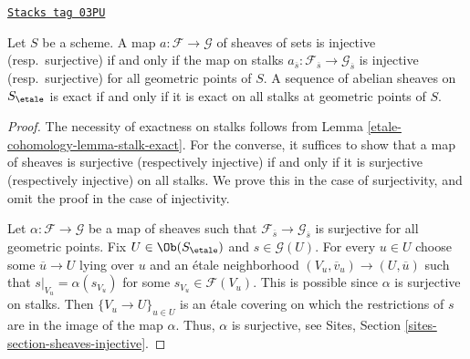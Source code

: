 \begin{theorem}
\label{etale-cohomology-theorem-exactness-stalks}
\href{https://stacks.math.columbia.edu/tag/03PU}{\texttt{Stacks tag 03PU}}

Let $S$ be a scheme.
A map $a : \mathcal{F} \to \mathcal{G}$ of sheaves of sets is injective
(resp.\ surjective) if and only if the map on stalks
$a_{\overline{s}} : \mathcal{F}_{\overline{s}} \to \mathcal{G}_{\overline{s}}$
is injective (resp.\ surjective) for all geometric points of $S$.
A sequence of abelian sheaves on $S_\etale$ is exact
if and only if it is exact on all stalks at geometric points of $S$.
\end{theorem}

\begin{proof}
The necessity of exactness on stalks follows from
Lemma \ref{etale-cohomology-lemma-stalk-exact}.
For the converse, it suffices to show that a map of sheaves is surjective
(respectively injective) if and only if it is surjective (respectively
injective) on all stalks. We prove this in the case of surjectivity, and omit
the proof in the case of injectivity.

\medskip\noindent
Let $\alpha : \mathcal{F} \to \mathcal{G}$ be a map of sheaves such
that $\mathcal{F}_{\overline{s}} \to \mathcal{G}_{\overline{s}}$
is surjective for all geometric points. Fix
$U \in \Ob(S_\etale)$
and $s \in \mathcal{G}(U)$. For every $u \in U$ choose some
$\overline{u} \to U$ lying over $u$ and an \'etale neighborhood
$(V_u , \overline{v}_u) \to (U, \overline{u})$ such that
$s|_{V_u} = \alpha(s_{V_u})$ for some
$s_{V_u} \in \mathcal{F}(V_u)$.
This is possible since $\alpha$ is surjective on
stalks. Then $\{V_u \to U\}_{u \in U}$
is an \'etale covering on which the restrictions of $s$
are in the image of the map $\alpha$.
Thus, $\alpha$ is surjective, see
Sites, Section \ref{sites-section-sheaves-injective}.
\end{proof}

